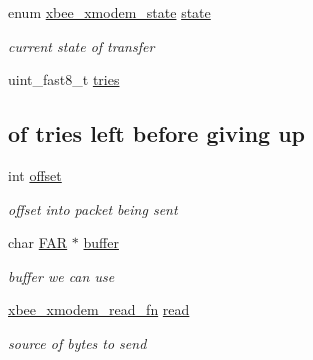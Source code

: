 \begin{DoxyCompactItemize}
\mbox{\label{group__util__xmodem_ga73b81fc5d708360fbba38aee9bc2eac0}} 
enum \hyperlink{group__util__xmodem_gaca3fc49d80cd9afccc34812b2985484f}{xbee\+\_\+xmodem\+\_\+state} \hyperlink{group__util__xmodem_ga73b81fc5d708360fbba38aee9bc2eac0}{state}
\begin{DoxyCompactList}\small\item\em current state of transfer \end{DoxyCompactList}\item 
\mbox{\label{group__util__xmodem_ga8623a9a322bbc93025b7c3337ed8849e}} 
uint\+\_\+fast8\+\_\+t \hyperlink{group__util__xmodem_ga8623a9a322bbc93025b7c3337ed8849e}{tries}
\begin{DoxyCompactList}\small\item\em \subsection*{of tries left before giving up}\end{DoxyCompactList}\item 
\mbox{\label{group__util__xmodem_gaed7ea92f45bd273dde380a45ddced592}} 
int \hyperlink{group__util__xmodem_gaed7ea92f45bd273dde380a45ddced592}{offset}
\begin{DoxyCompactList}\small\item\em offset into packet being sent \end{DoxyCompactList}\item 
\mbox{\label{group__util__xmodem_ga747adede719506ced8838721ed104364}} 
char \hyperlink{group__hal_gaef060b3456fdcc093a7210a762d5f2ed}{F\+AR} $\ast$ \hyperlink{group__util__xmodem_ga747adede719506ced8838721ed104364}{buffer}
\begin{DoxyCompactList}\small\item\em buffer we can use \end{DoxyCompactList}\item 
\hyperlink{group__util__xmodem_ga25f49dbd4c2f9e274a32217a709d6382}{xbee\+\_\+xmodem\+\_\+read\+\_\+fn} \hyperlink{group__util__xmodem_gac73e7e9b654a58e232f8c1380cd68dfa}{read}
\begin{DoxyCompactList}\small\item\em source of bytes to send \end{DoxyCompactList}\item 

\end{DoxyCompactItemize}
